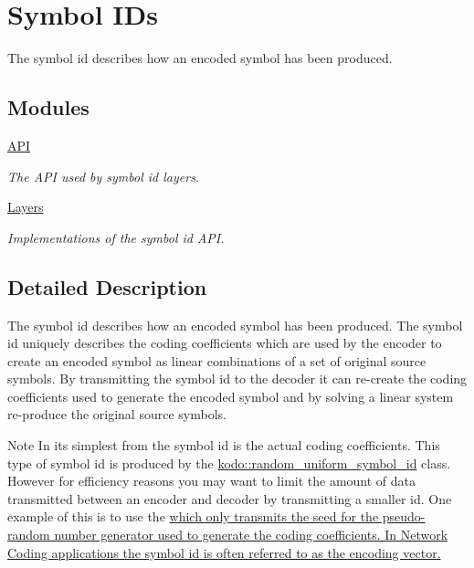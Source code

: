 \hypertarget{group__symbol__id}{\section{Symbol I\-Ds}
\label{group__symbol__id}
}


The symbol id describes how an encoded symbol has been produced.  


\subsection*{Modules}
\begin{DoxyCompactItemize}
\item 
\hyperlink{group__symbol__id__api}{A\-P\-I}
\begin{DoxyCompactList}\small\item\em The A\-P\-I used by symbol id layers. \end{DoxyCompactList}\item 
\hyperlink{group__symbol__id__layers}{Layers}
\begin{DoxyCompactList}\small\item\em Implementations of the symbol id A\-P\-I. \end{DoxyCompactList}\end{DoxyCompactItemize}


\subsection{Detailed Description}
The symbol id describes how an encoded symbol has been produced. The symbol id uniquely describes the coding coefficients which are used by the encoder to create an encoded symbol as linear combinations of a set of original source symbols. By transmitting the symbol id to the decoder it can re-\/create the coding coefficients used to generate the encoded symbol and by solving a linear system re-\/produce the original source symbols. \begin{DoxyNote}{Note}
In its simplest from the symbol id is the actual coding coefficients. This type of symbol id is produced by the \hyperlink{}{kodo\-::random\-\_\-uniform\-\_\-symbol\-\_\-id} class. However for efficiency reasons you may want to limit the amount of data transmitted between an encoder and decoder by transmitting a smaller id. One example of this is to use the \hyperlink{}{which only transmits the seed for the pseudo-\/random number generator used to generate the coding coefficients.  In Network Coding applications the symbol id is often referred to as the encoding vector. }
\end{DoxyNote}

